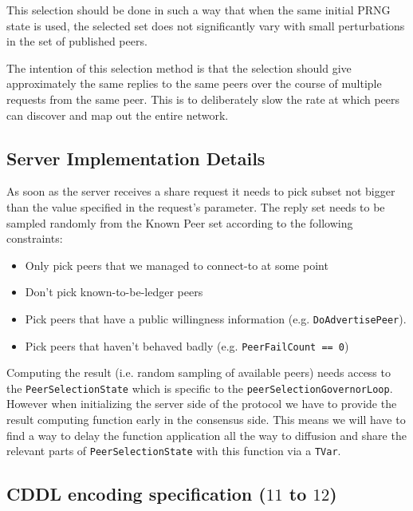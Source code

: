 This selection should be done in such a way that when the same initial PRNG
state is used, the selected set does not significantly vary with small
perturbations in the set of published peers.

The intention of this selection method is that the selection should give
approximately the same replies to the same peers over the course of multiple
requests from the same peer. This is to deliberately slow the rate at which
peers can discover and map out the entire network.

\subsection{Server Implementation Details}

As soon as the server receives a share request it needs to pick subset not bigger than the
value specified in the request's parameter. The reply set needs to be sampled randomly
from the Known Peer set according to the following constraints:

\begin{itemize}
  \item Only pick peers that we managed to connect-to at some point
  \item Don't pick known-to-be-ledger peers
  \item Pick peers that have a public willingness information (e.g. \texttt{DoAdvertisePeer}).
  \item Pick peers that haven't behaved badly (e.g. \texttt{PeerFailCount == 0})
\end{itemize}

Computing the result (i.e. random sampling of available peers) needs access to the
\texttt{PeerSelectionState} which is specific to the \texttt{peerSelectionGovernorLoop}. However when
initializing the server side of the protocol we have to provide the result computing
function early in the consensus side. This means we will have to find a way to delay the
function application all the way to diffusion and share the relevant parts of
\texttt{PeerSelectionState} with this function via a \texttt{TVar}.

\subsection{CDDL encoding specification ($11$ to $12$)}\label{peersharing-cddl}


